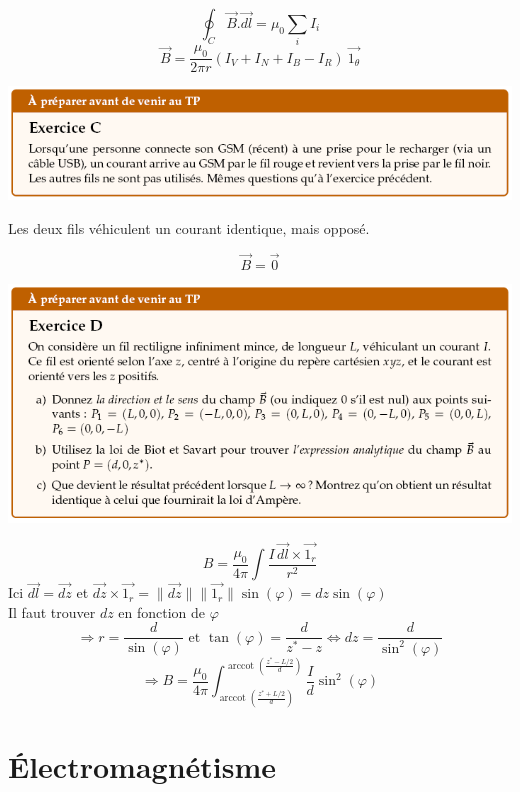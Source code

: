 \documentclass	[11pt, a4paper, openany]{book}
\DeclareMathOperator{\arccot}{arccot}
\begin{document}
$$\oint_C \vec{B}.\vec{dl} = \mu_0 \sum_i I_i$$
$$\vec{B} = \frac{\mu_0}{2\pi r}\left(I_V + I_N + I_B - I_R\right)\ \vec{1_\theta}$$




\newpage
\begin{center}
\includegraphics[scale=0.85]{prepa/magneto3.png}\\
\end{center}
\begin{center}
Les deux fils véhiculent un courant identique, mais opposé.
\end{center}
$$\vec{B} = \vec{0}$$

\begin{center}
\includegraphics[scale=0.85]{prepa/magneto4.png}\\
\end{center}
$$B=\frac{\mu_0}{4\pi}\int \frac{I\,\vec{dl}\times\vec{1_r}}{r^2}$$Ici $\vec{dl}=\vec{dz}$ et $\vec{dz}\times\vec{1_r}=\|\vec{dz}\| \|\vec{1_r}\|\sin(\varphi)=dz\sin(\varphi)$\\
Il faut trouver $dz$ en fonction de $\varphi$  $$\Rightarrow r=\frac{d}{\sin(\varphi)}\text{ et } \tan(\varphi)=\frac{d}{z^*-z}\Leftrightarrow dz=\frac{d}{\sin^2(\varphi)}$$
$$\Rightarrow B = \frac{\mu_0}{4\pi}\int_{\arccot\left(\frac{z^*+L/2}{d}\right)}^{\arccot\left(\frac{z^*-L/2}{d}\right)}\frac{I}{d}\sin^2(\varphi)$$
		


\newpage
\section{Électromagnétisme}
\end{document}
